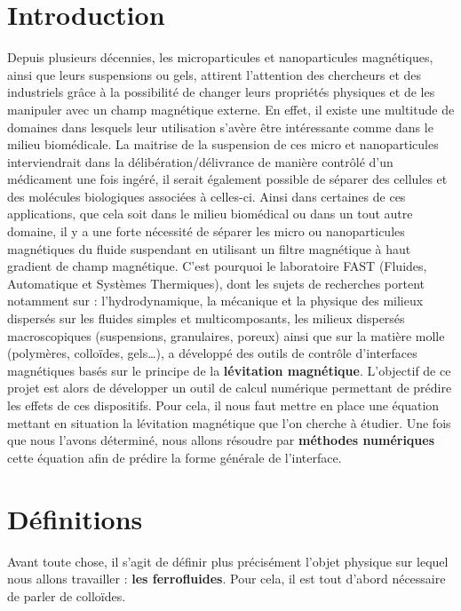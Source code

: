 \documentclass[10pt,a4paper]{article}
\begin{document}
\tableofcontents
\newpage
\section{Introduction}
Depuis plusieurs décennies, les microparticules et nanoparticules magnétiques, ainsi que leurs
suspensions ou gels, attirent l’attention des chercheurs et des industriels grâce à la possibilité
de changer leurs propriétés physiques et de les manipuler avec un champ magnétique externe.
En effet,  il existe une multitude de domaines dans lesquels leur utilisation s'avère être intéressante comme dans le milieu biomédicale. La maitrise de la suspension de ces micro et nanoparticules interviendrait dans la délibération/délivrance de manière contrôlé d'un médicament une fois ingéré, il serait également possible de séparer des cellules et des molécules biologiques associées à celles-ci. 
Ainsi dans certaines de ces applications, que cela soit dans le milieu biomédical ou dans un tout autre domaine, il y a une forte nécessité de séparer les micro ou  nanoparticules magnétiques du fluide suspendant en utilisant un filtre magnétique à haut gradient de champ magnétique.
\newline
\newline
C'est pourquoi le laboratoire FAST (Fluides, Automatique et Systèmes Thermiques), dont les sujets de recherches portent notamment sur  : l’hydrodynamique, la mécanique et la physique des milieux dispersés sur les fluides simples et multicomposants, les milieux dispersés macroscopiques (suspensions, granulaires, poreux) ainsi que sur la matière molle (polymères, colloïdes, gels…), a développé des outils de contrôle d’interfaces magnétiques basés sur le principe de la \textbf{lévitation magnétique}. L'objectif de ce projet est alors de développer un outil de calcul numérique permettant de prédire les effets de ces dispositifs.
\newline
\newline
Pour cela, il nous faut mettre en place une équation mettant en situation la lévitation magnétique que l'on cherche à étudier. Une fois que nous l'avons déterminé, nous allons résoudre par \textbf{méthodes numériques} cette équation afin de prédire la forme générale de l'interface.  
\section{Définitions}
Avant toute chose, il s'agit de définir plus précisément l'objet physique sur lequel nous allons travailler : \textbf{les ferrofluides}. Pour cela, il est tout d'abord nécessaire de parler de colloïdes.
\end{document}
